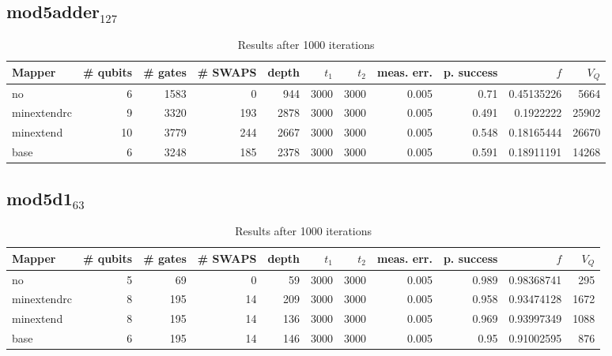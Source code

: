 \documentclass[11pt]{article}
\begin{document}
\subsection{mod5adder\(_{\text{127}}\)}
\label{sec:org0ccf1f7}
\begin{table}[!htpb]
\caption{\label{tab:orgac325e3}
Results after 1000 iterations}
\centering
\begin{tabular}{lrrrrrrrrrr}
\hline
Mapper & \# qubits & \# gates & \# SWAPS & depth & \(t_1\) & \(t_2\) & meas. err. & p. success & \(f\) & \(V_Q\)\\
\hline
no & 6 & 1583 & 0 & 944 & 3000 & 3000 & 0.005 & 0.71 & 0.45135226 & 5664\\
\hline
minextendrc & 9 & 3320 & 193 & 2878 & 3000 & 3000 & 0.005 & 0.491 & 0.1922222 & 25902\\
minextend & 10 & 3779 & 244 & 2667 & 3000 & 3000 & 0.005 & 0.548 & 0.18165444 & 26670\\
base & 6 & 3248 & 185 & 2378 & 3000 & 3000 & 0.005 & 0.591 & 0.18911191 & 14268\\
\hline
\end{tabular}
\end{table}
\subsection{mod5d1\(_{\text{63}}\)}
\label{sec:orgbd123d2}
\begin{table}[!htpb]
\caption{\label{tab:orgdebe707}
Results after 1000 iterations}
\centering
\begin{tabular}{lrrrrrrrrrr}
\hline
Mapper & \# qubits & \# gates & \# SWAPS & depth & \(t_1\) & \(t_2\) & meas. err. & p. success & \(f\) & \(V_Q\)\\
\hline
no & 5 & 69 & 0 & 59 & 3000 & 3000 & 0.005 & 0.989 & 0.98368741 & 295\\
\hline
minextendrc & 8 & 195 & 14 & 209 & 3000 & 3000 & 0.005 & 0.958 & 0.93474128 & 1672\\
minextend & 8 & 195 & 14 & 136 & 3000 & 3000 & 0.005 & 0.969 & 0.93997349 & 1088\\
base & 6 & 195 & 14 & 146 & 3000 & 3000 & 0.005 & 0.95 & 0.91002595 & 876\\
\hline
\end{tabular}
\end{table}
\end{document}
